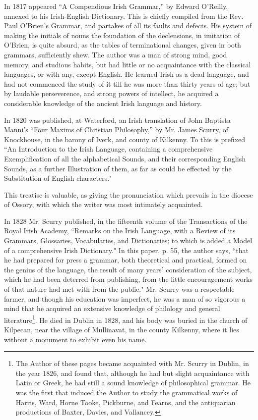 \documentclass[11pt,oneside]{memoir}
\begin{document}
In 1817 appeared ``A Compendious Irish Grammar,'' by Edward O'Reilly, annexed to his Irish-English Dictionary.
This is chiefly compiled from the Rev. Paul O'Brien's Grammar, and partakes of all its faults and defects.
His system of making the initials of nouns the foundation of the declensions, in imitation of O'Brien, is quite absurd, as the tables of terminational changes, given in both grammars, sufficiently shew.
The author was a man of strong mind, good memory, and studious habits, but had little or no acquaintance with the classical languages, or with any, except English.
He learned Irish as a dead language, and had not commenced the study of it till he was more than thirty years of age; but by laudable perseverence, and strong powers of intellect, he acquired a considerable knowledge of the ancient Irish language and history. 

In 1820 was published, at Waterford, an Irish translation of John Baptista Manni's ``Four Maxims of Christian Philosophy,'' by Mr. James Scurry, of Knockhouse, in the barony of Iverk, and county of Kilkenny.
To this is prefixed ``An Introduction to the Irish Language, containing a comprehensive Exemplification of all the alphabetical Sounds, and their corresponding English Sounds, as a further Illustration of them, as far as could be effected by the Substitution of English characters." 

This treatise is valuable, as giving the pronunciation which prevails in the diocese of Ossory, with which the writer was most intimately acquainted. 

In 1828 Mr. Scurry published, in the fifteenth volume of the Transactions of the Royal Irish Academy, ``Remarks on the Irish Language, with a Review of its Grammars, Glossaries, Vocabularies, and Dictionaries; to which is added a Model of a comprehensive Irish Dictionary."
In this paper, p. 55, the author says, ``that he had prepared for press a grammar, both theoretical and practical, formed on the genius of the language, the result of many years' consideration of the subject, which he had been deterred from publishing, from the little encouragement works of that nature had met with from the public."
Mr. Scurry was a respectable farmer, and though his education was imperfect, he was a man of so vigorous a mind that he acquired an extensive knowledge of philology and general literature\footnote{
    The Author of these pages became acquainted with Mr. Scurry in Dublin, in the year 1826, and found that, although he had but slight acquaintance with Latin or Greek, he had still a sound knowledge of philosophical grammar.
    He was the first that induced the Author to study the grammatical works of Harris, Ward, Horne Tooke, Pickburne, and Fearns, and the antiquarian productions of Baxter, Davies, and Vallancey.
}.
He died in Dublin in 1828, and his body was buried in the church of Kilpecan, near the village of Mullinavat, in the county Kilkenny, where it lies without a monument to exhibit even his name. 
\end{document}
